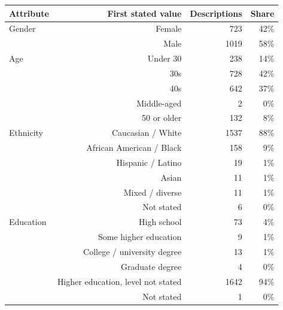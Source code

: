 \begin{tabular}{lrrr}
\toprule
Attribute & First stated value & Descriptions & Share \\
\midrule
Gender & Female & 723 & 42\% \\
 & Male & 1019 & 58\% \\
Age & Under 30 & 238 & 14\% \\
 & 30s & 728 & 42\% \\
 & 40s & 642 & 37\% \\
 & Middle-aged & 2 & 0\% \\
 & 50 or older & 132 & 8\% \\
Ethnicity & Caucasian / White & 1537 & 88\% \\
 & African American / Black & 158 & 9\% \\
 & Hispanic / Latino & 19 & 1\% \\
 & Asian & 11 & 1\% \\
 & Mixed / diverse & 11 & 1\% \\
 & Not stated & 6 & 0\% \\
Education & High school & 73 & 4\% \\
 & Some higher education & 9 & 1\% \\
 & College / university degree & 13 & 1\% \\
 & Graduate degree & 4 & 0\% \\
 & Higher education, level not stated & 1642 & 94\% \\
 & Not stated & 1 & 0\% \\
\bottomrule
\end{tabular}
